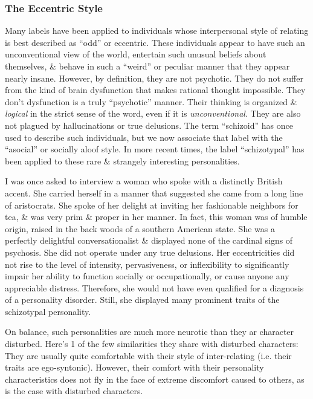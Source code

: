 \documentclass{article}
\numberwithin{equation}{section}
\begin{document}
\subsubsection{The Eccentric Style}
Many labels have been applied to individuals whose interpersonal style of relating is best described as ``odd'' or eccentric. These individuals appear to have such an unconventional view of the world, entertain such unusual beliefs about themselves, \& behave in such a ``weird'' or peculiar manner that they appear nearly insane. However, by definition, they are not psychotic. They do not suffer from the kind of brain dysfunction that makes rational thought impossible. They don't dysfunction is a truly ``psychotic'' manner. Their thinking is organized \& \textit{logical} in the strict sense of the word, even if it is \textit{unconventional}. They are also not plagued by hallucinations or true delusions. The term ``schizoid'' has once used to describe such individuals, but we now associate that label with the ``asocial'' or socially aloof style. In more recent times, the label ``schizotypal'' has been applied to these rare \& strangely interesting personalities.

I was once asked to interview a woman who spoke with a distinctly British accent. She carried herself in a manner that suggested she came from a long line of aristocrats. She spoke of her delight at inviting her fashionable neighbors for tea, \& was very prim \& proper in her manner. In fact, this woman was of humble origin, raised in the back woods of a southern American state. She was a perfectly delightful conversationalist \& displayed none of the cardinal signs of psychosis. She did not operate under any true delusions. Her eccentricities did not rise to the level of intensity, pervasiveness, or inflexibility to significantly impair her ability to function socially or occupationally, or cause anyone any appreciable distress. Therefore, she would not have even qualified for a diagnosis of a personality disorder. Still, she displayed many prominent traits of the schizotypal personality.

On balance, such personalities are much more neurotic than they ar character disturbed. Here's 1 of the few similarities they share with disturbed characters: They are usually quite comfortable with their style of inter-relating (i.e. their traits are ego-syntonic). However, their comfort with their personality characteristics does not fly in the face of extreme discomfort caused to others, as is the case with disturbed characters.
\end{document}
